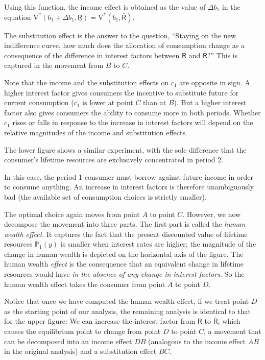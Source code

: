 \documentclass{scrartcl}
\begin{document}
  Using this function, the income effect is obtained as the value of $\Delta \boldsymbol{\mathit{b}}_{1}$ in the equation $\mathrm{V}^{*}(\boldsymbol{\mathit{b}}_{1}+\Delta \boldsymbol{\mathit{b}}_{1},\underline{\mathsf{R}})=\mathrm{V}^{*}(\boldsymbol{\mathit{b}}_{1},\bar{\mathsf{R}})$.

  The substitution effect is the answer to the question, ``Staying on the new indifference curve, how much does the allocation of consumption change as a consequence of the difference in interest factors between $\underline{\mathsf{R}}$ and $\bar{\mathsf{R}}$?''  This is captured in the movement from $B$ to $C$.

  Note that the income and the substitution effects on $\boldsymbol{\mathit{c}}_{1}$ are opposite in sign.
  A higher interest factor gives consumers the incentive to substitute future for current consumption ($\boldsymbol{\mathit{c}}_{1}$ is lower at point $C$ than at $B$).
  But a higher interest factor also gives consumers the ability to consume more in both periods.
  Whether $\boldsymbol{\mathit{c}}_{1}$ rises or falls in response to the increase in interest factors will depend on the relative magnitudes of the income and substitution effects.

  The lower figure shows a similar experiment, with the sole difference that the consumer's lifetime resources are exclusively concentrated in period 2.

  In this case, the period 1 consumer must borrow against future income in order to consume anything.
  An increase in interest factors is therefore unambiguously bad (the available set of consumption choices is strictly smaller).

  The optimal choice again moves from point $A$ to point $C$.
  However, we now decompose the movement into three parts.
  The first part is called the \textit{human wealth effect}.
  It captures the fact that the present discounted value of lifetime resources ${\mathbb{P}}_{1}(y)$ is smaller when interest rates are higher; the magnitude of the change in human wealth is depicted on the horizontal axis of the figure.
  The human wealth \textit{effect} is the consequence that an equivalent change in lifetime resources would have \textit{in the absence of any change in interest factors}.
  So the human wealth effect takes the consumer from point $A$ to point $D$.

  Notice that once we have computed the human wealth effect, if we treat point $D$ as the starting point of our analysis, the remaining analysis is identical to that for the upper figure: We can increase the interest factor from $\underline{\mathsf{R}}$ to $\bar{\mathsf{R}}$, which causes the equilibrium point to change from point $D$ to point $C$, a movement that can be decomposed into an income effect $DB$ (analogous to the income effect $AB$ in the original analysis) and a substitution effect $BC$.
\end{document}
